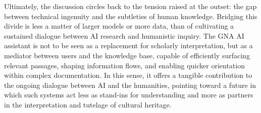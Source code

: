 \begin{spacing}{1.5}
Ultimately, the discussion circles back to the tension raised at the outset: the gap between technical ingenuity and the subtleties of human knowledge. Bridging this divide is less a matter of larger models or more data, than of cultivating a sustained dialogue between AI research and humanistic inquiry. The GNA AI assistant is not to be seen as a replacement for scholarly interpretation, but as a mediator between users and the knowledge base, capable of efficiently surfacing relevant passages, shaping information flows, and enabling quicker orientation within complex documentation. In this sense, it offers a tangible contribution to the ongoing dialogue between AI and the humanities, pointing toward a future in which such systems act less as stand-ins for understanding and more as partners in the interpretation and tutelage of cultural heritage.

\end{spacing}